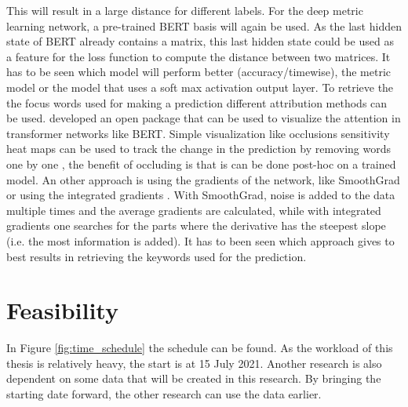 \documentclass{article}
\begin{document}
This will result in a large distance for different labels.
For the deep metric learning network, a pre-trained BERT basis will again be used.
As the last hidden state of BERT already contains a matrix, this last hidden state could be used as a feature for the loss function to compute the distance between two matrices.
It has to be seen which model will perform better (accuracy/timewise), the metric model or the model that uses a soft max activation output layer. 
To retrieve the the focus words used for making a prediction different attribution methods can be used.
\textcite{vig_multiscale_2019} developed an open package that can be used to visualize the attention in transformer networks like BERT.
Simple visualization like occlusions sensitivity heat maps can be used to track the change in the prediction by removing words one by one \autocite{fleet_visualizing_2014}, the benefit of occluding is that is can be done post-hoc on a trained model.
An other approach is using the gradients of the network, like SmoothGrad \autocite{smilkov_smoothgrad_2017} or using the integrated gradients \autocite{sundararajan_axiomatic_2017}.
With SmoothGrad, noise is added to the data multiple times and the average gradients are calculated, while with integrated gradients one searches for the parts where the derivative has the steepest slope (i.e. the most information is added).
It has to been seen which approach gives to best results in retrieving the keywords used for the prediction.

\section{Feasibility}
In Figure \ref{fig:time_schedule} the schedule can be found. 
As the workload of this thesis is relatively heavy, the start is at 15 July 2021.
Another research is also dependent on some data that will be created in this research.
By bringing the starting date forward, the other research can use the data earlier.
\end{document}
